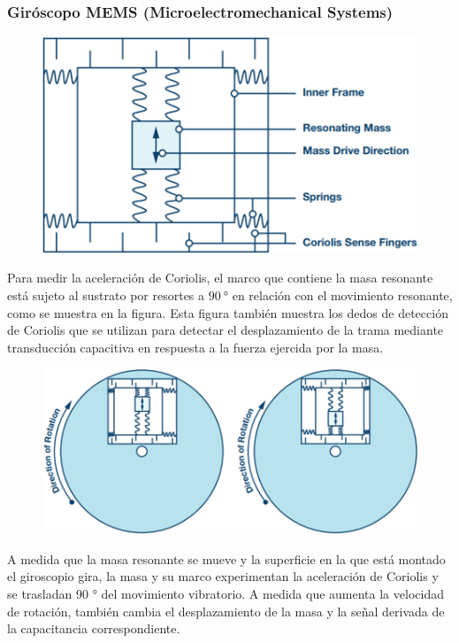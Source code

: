 \begin{frame}
    \frametitle{Giróscopo MEMS (Microelectromechanical Systems)}
    \scriptsize

    \begin{figure}[!h]
        \centering
        \includegraphics[width=0.2\columnwidth]{images/gyroscope_mems_structure.png}
    \end{figure}


    Para medir la aceleración de Coriolis, el marco que contiene la masa resonante está sujeto al sustrato por resortes a $\SI{90}{\degree}$ en relación con el movimiento resonante, como se muestra en la figura. Esta figura también muestra los dedos de detección de Coriolis que se utilizan para detectar el desplazamiento de la trama mediante transducción capacitiva en respuesta a la fuerza ejercida por la masa.

    \begin{figure}[!h]
        \centering
        \includegraphics[width=0.3\columnwidth]{images/gyroscope_mems_3.png}
    \end{figure}

    A medida que la masa resonante se mueve y la superficie en la que está montado el giroscopio gira, la masa y su marco experimentan la aceleración de Coriolis y se trasladan 90 ° del movimiento vibratorio. A medida que aumenta la velocidad de rotación, también cambia el desplazamiento de la masa y la señal derivada de la capacitancia correspondiente.
\end{frame}




